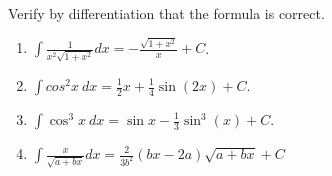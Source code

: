 \begin{problem}
Verify by differentiation that the formula is correct.
\begin{multicols}{2}
\begin{enumerate}
\item $\displaystyle \int\frac{1}{x^2\sqrt{1+x^2}}dx=-\frac{\sqrt{1+x^2}}{x}+C$.
\item $\displaystyle \int cos^2x ~d x= \frac{1}{2}x +\frac{1}{4}\sin (2x)+C$.
\item $\displaystyle \int \cos^3 x ~dx =\sin x - \frac{1}{3}\sin^3 (x)+C$.
\item $\displaystyle \int \frac{x}{\sqrt{a+bx}}dx= \frac{2}{3b^2}(bx-2a)\sqrt{a+bx}+C$
\end{enumerate}
\end{multicols}
\end{problem}
